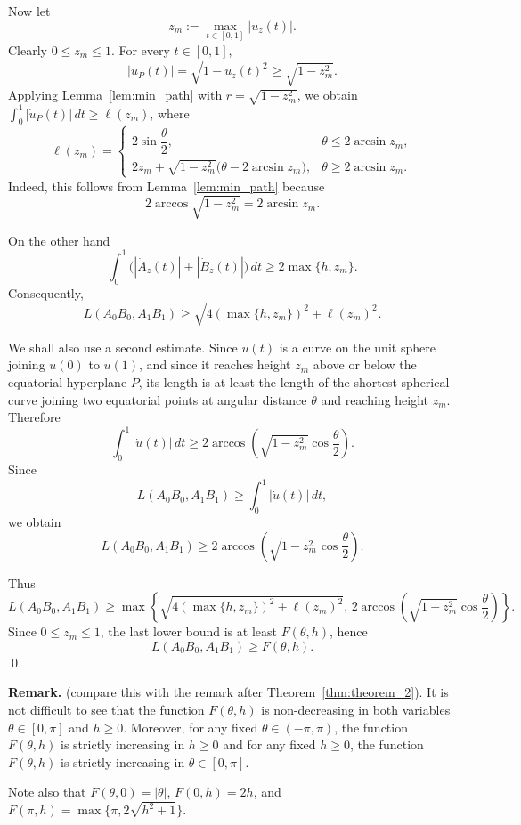 \documentclass[a4paper,12pt,reqno]{amsart}
\begin{document}
\medskip
Now let
\[
z_m:=\max_{t\in[0,1]} |u_z(t)|.
\]
Clearly \(0\le z_m\le 1\). For every \(t\in[0,1]\),
\[
|u_P(t)|=\sqrt{1-u_z(t)^2}\ge \sqrt{1-z_m^2}.
\]
Applying Lemma~\ref{lem:min_path} with $r=\sqrt{1-z_m^2}$, we obtain $\displaystyle \int_0^1 |\dot u_P(t)|\,dt\ge \ell(z_m)$, where
\[
\ell(z_m)=
\begin{cases}
2\sin\dfrac{\theta}{2},
&
\theta\le 2\arcsin z_m,
\\[8pt]
2z_m+\sqrt{1-z_m^2}\bigl(\theta-2\arcsin z_m\bigr),
&
\theta\ge 2\arcsin z_m.
\end{cases}
\]
Indeed, this follows from Lemma~\ref{lem:min_path} because
\[
2\arccos\sqrt{1-z_m^2}=2\arcsin z_m.
\]

On the other hand
\[
\int_0^1\bigl(|\dot A_z(t)|+|\dot B_z(t)|\bigr)\,dt\ge 2\max\{h,z_m\}.
\]
Consequently,
\[
L(A_0B_0,A_1B_1)
\ge
\sqrt{4\left(\max\{h,z_m\}\right)^2+\ell(z_m)^2}.
\]

We shall also use a second estimate. Since \(u(t)\) is a curve on the unit sphere joining \(u(0)\) to \(u(1)\), and since it reaches height \(z_m\) above or below the equatorial hyperplane \(P\), its length is at least the length of the shortest spherical curve joining two equatorial points at angular distance \(\theta\) and reaching height \(z_m\). Therefore
\[
\int_0^1 |\dot u(t)|\,dt
\ge
2\arccos\left(\sqrt{1-z_m^2}\cos\frac{\theta}{2}\right).
\]
Since
\[
L(A_0B_0,A_1B_1)\ge \int_0^1 |\dot u(t)|\,dt,
\]
we obtain
\[
L(A_0B_0,A_1B_1)
\ge
2\arccos\left(\sqrt{1-z_m^2}\cos\frac{\theta}{2}\right).
\]

Thus
\[
L(A_0B_0,A_1B_1)
\ge
\max\left\{
\sqrt{4\left(\max\{h,z_m\}\right)^2+\ell(z_m)^2},
\,
2\arccos\left(\sqrt{1-z_m^2}\cos\frac{\theta}{2}\right)
\right\}.
\] 
Since $0\le z_m\le 1$, the last lower bound is at least $F(\theta, h)$, hence
\[
L(A_0B_0,A_1B_1)
\ge
F(\theta,h).
\]
\qed

\smallskip
\noindent \textbf{Remark.} (compare this with the remark after Theorem~\ref{thm:theorem_2}). It is not difficult to see that the function $F(\theta, h)$ is non-decreasing in both variables $\theta \in[0,\pi]$ and $h\ge 0$. Moreover, for any fixed $\theta\in (-\pi,\pi)$, the function $F(\theta, h)$ is strictly increasing in $h\ge 0$ and for any fixed $h\ge 0$, the function $F(\theta,h)$ is strictly increasing in $\theta\in[0,\pi]$. 

Note also that $F(\theta,0)=|\theta|$, $F(0,h)=2h$, and $F(\pi,h)=\max\{\pi, 2\sqrt{h^2+1}\}$. 
\end{document}
